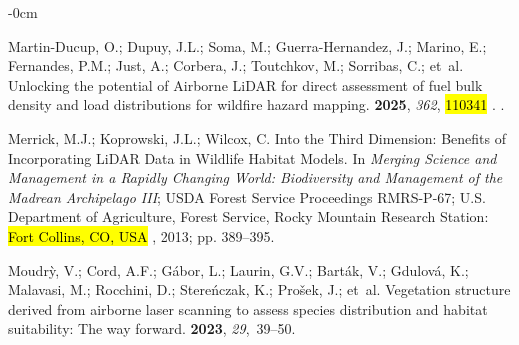 \documentclass[remotesensing,article,accept,pdftex,moreauthors]{Definitions/mdpi}
\begin{document}

\begin{adjustwidth}{-\extralength}{0cm}
  \begin{thebibliography}{999}

Martin-Ducup, O.; Dupuy, J.L.; Soma, M.; Guerra-Hernandez, J.; Marino, E.;
  Fernandes, P.M.; Just, A.; Corbera, J.; Toutchkov, M.; Sorribas, C.;  et~al.
\newblock Unlocking the potential of Airborne {LiDAR} for direct assessment of
  fuel bulk density and load distributions for wildfire hazard mapping.
 {\bf 2025}, {\em
  362}, \hl{110341}%
.
.

Merrick, M.J.; Koprowski, J.L.; Wilcox, C.
\newblock Into the Third Dimension: Benefits of Incorporating {LiDAR} Data in
  Wildlife Habitat Models.
\newblock In \emph{Merging Science and Management in a Rapidly
  Changing World: Biodiversity and Management of the Madrean Archipelago III}; USDA Forest Service Proceedings RMRS-P-67; U.S. Department of Agriculture, Forest Service, Rocky Mountain Research Station: \hl{Fort Collins, CO, USA}%
, 2013; pp. 389--395.

Moudr{\`y}, V.; Cord, A.F.; G{\'a}bor, L.; Laurin, G.V.; Bart{\'a}k, V.;
  Gdulov{\'a}, K.; Malavasi, M.; Rocchini, D.; Stere{\'n}czak, K.;
  Pro{\v{s}}ek, J.;  et~al.
\newblock Vegetation structure derived from airborne laser scanning to assess
  species distribution and habitat suitability: The way forward.
 {\bf 2023}, {\em 29},~39--50.


\end{thebibliography}
\end{adjustwidth}
\end{document}
